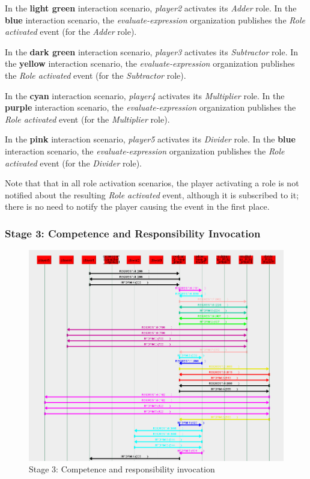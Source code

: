 In the \textbf{light green} interaction scenario, \textit{player2} activates its \textit{Adder} role.
In the \textbf{blue} interaction scenario, the \textit{evaluate-expression} organization publishes the \textit{Role activated} event (for the \textit{Adder} role).

In the \textbf{dark green} interaction scenario, \textit{player3} activates its \textit{Subtractor} role.
In the \textbf{yellow} interaction scenario, the \textit{evaluate-expression} organization publishes the \textit{Role activated} event (for the \textit{Subtractor} role).

In the \textbf{cyan} interaction scenario, \textit{player4} activates its \textit{Multiplier} role.
In the \textbf{purple} interaction scenario, the \textit{evaluate-expression} organization publishes the \textit{Role activated} event (for the \textit{Multiplier} role).

In the \textbf{pink} interaction scenario, \textit{player5} activates its \textit{Divider} role.
In the \textbf{blue} interaction scenario, the \textit{evaluate-expression} organization publishes the \textit{Role activated} event (for the \textit{Divider} role).

Note that that in all role activation scenarios, the player activating a role is not notified about the resulting \textit{Role activated} event, although it is subscribed to it; there is no need to notify the player causing the event in the first place.

\subsubsection*{Stage 3: Competence and Responsibility Invocation}

\begin{figure}[H]
	\centering
	\includegraphics[width=\textwidth]{images/examples/example2-stage3.png}
	\caption{Stage 3: Competence and responsibility invocation}
	\label{figure:example2-stage3}
\end{figure}

